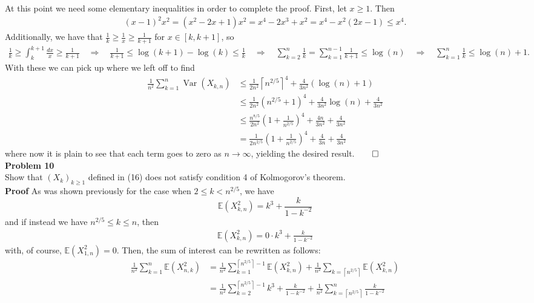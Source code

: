 \documentclass[10pt]{article}
\newcommand{\E}{\mathbb{E}}
\newcommand{\bp}[1]{\left({#1}\right)}
\newcommand{\1}[1]{\mathbbm{1}_{#1}}
\newcommand*{\ceil}[1]{\left\lceil#1\right\rceil}
\DeclareMathOperator{\Var}{Var}
\begin{document}
    At this point we need some elementary inequalities in order to complete the proof. First, let $x\geq1$. Then
    \begin{align*}
        (x-1)^2x^2=(x^2-2x+1)x^2=x^4-2x^3+x^2=x^4-x^2(2x-1)\leq x^4.\tag{20}
    \end{align*}
    Additionally, we have that $\tfrac{1}{k}\geq\tfrac{1}{x}\geq\tfrac{1}{k+1}$ for $x\in[k,k+1]$, so
    \begin{align*}
        \frac{1}{k}\geq\int_{k}^{k+1}\frac{dx}{x}\geq\frac{1}{k+1}\quad\Rightarrow\quad\frac{1}{k+1}\leq\log(k+1)-\log(k)\leq\frac{1}{k}\quad\Rightarrow\quad\sum_{k=2}^n\frac{1}{k}=\sum_{k=1}^{n-1}\frac{1}{k+1}\leq\log(n)\quad\Rightarrow\quad \sum_{k=1}^n\frac{1}{k}\leq\log(n)+1.\tag{21}
    \end{align*}
    With these we can pick up where we left off to find
    \begin{align*}
        \frac{1}{n^2}\sum_{k=1}^n\Var(X_{k,n})&\leq \frac{1}{2n^2}\ceil{n^{2/5}}^4+\frac{4}{3n^2}(\log(n)+1)\tag{by (20) and (21)}\\
        &\leq \frac{1}{2n^2}(n^{2/5}+1)^4+\frac{4}{3n^2}\log(n)+\frac{4}{3n^2}\\
        &\leq \frac{n^{8/5}}{2n^2}\bp{1+\frac{1}{n^{2/5}}}^4+\frac{4n}{3n^2}+\frac{4}{3n^2}\tag{$\log(n)\leq n$}\\
        &=\frac{1}{2n^{2/5}}\bp{1+\frac{1}{n^{2/5}}}^4+\frac{4}{3n}+\frac{4}{3n^2}
    \end{align*}
    where now it is plain to see that each term goes to zero as $n\rightarrow\infty$, yielding the desired result.\hfill{$\qed$}\\[5pt]
    {\bf Problem 10}\\[5pt]
    Show that $(X_k)_{k\geq 1}$ defined in (16) does not satisfy condition 4 of Kolmogorov's theorem.\\[5pt]
    {\bf Proof}\hspace{5pt} As was shown previously for the case when $2\leq k<n^{2/5}$, we have
    \[\E(X_{k,n}^2)=k^3+\frac{k}{1-k^{-2}}\]
    and if instead we have $n^{2/5}\leq k\leq n$, then
    \begin{align*}
        \E(X_{k,n}^2)=0\cdot k^3+\frac{k}{1-k^{-2}}
    \end{align*}
    with, of course, $\E(X_{1,n}^2)=0$. Then, the sum of interest can be rewritten as follows:
    \begin{align*}
        \frac{1}{n^2}\sum_{k=1}^n\E(X_{n,k}^2)&=\frac{1}{n^2}\sum_{k=1}^{\ceil{n^{2/5}}-1}\E(X_{k,n}^2)+\frac{1}{n^2}\sum_{k=\ceil{n^{2/5}}}\E(X_{k,n}^2)\\
        &=\frac{1}{n^2}\sum_{k=2}^{\ceil{n^{2/5}}-1}k^3+\frac{k}{1-k^{-2}}+\frac{1}{n^2}\sum_{k=\ceil{n^{2/5}}}^n\frac{k}{1-k^{-2}}\\
    \end{align*}
\end{document}
